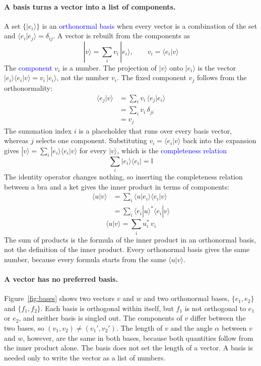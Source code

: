 \paragraph{A basis turns a vector into a list of components.} A set $\{|e_i\rangle\}$ is an \textcolor{blue}{orthonormal basis} when every vector is a combination of the set and $\langle e_i | e_j \rangle = \delta_{ij}$. A vector is rebuilt from the components as
\begin{equation*}
    |v\rangle = \sum_i v_i\, |e_i\rangle, \qquad v_i = \langle e_i | v \rangle
\end{equation*}
The \textcolor{blue}{component} $v_i$ is a number. The projection of $|v\rangle$ onto $|e_i\rangle$ is the vector $|e_i\rangle\langle e_i | v \rangle = v_i\, |e_i\rangle$, not the number $v_i$. The fixed component $v_j$ follows from the orthonormality:
\begin{align*}
    \langle e_j | v \rangle &= \sum_i v_i\, \langle e_j | e_i \rangle \\
    &= \sum_i v_i\, \delta_{ji} \\
    &= v_j
\end{align*}
The summation index $i$ is a placeholder that runs over every basis vector, whereas $j$ selects one component. Substituting $v_i = \langle e_i | v \rangle$ back into the expansion gives $|v\rangle = \sum_i |e_i\rangle\langle e_i | v \rangle$ for every $|v\rangle$, which is the \textcolor{blue}{completeness relation}
\begin{equation*}
    \sum_i |e_i\rangle\langle e_i| = \mathbb{I}
\end{equation*}
The identity operator changes nothing, so inserting the completeness relation between a bra and a ket gives the inner product in terms of components:
\begin{align*}
    \langle u | v \rangle &= \sum_i \langle u | e_i \rangle \langle e_i | v \rangle \\
    &= \sum_i \langle e_i | u \rangle^{*} \langle e_i | v \rangle
\end{align*}
\begin{equation}
    \boxed{\langle u | v \rangle = \sum_i u_i^{*}\, v_i}
\end{equation}
The sum of products is the formula of the inner product in an orthonormal basis, not the definition of the inner product. Every orthonormal basis gives the same number, because every formula starts from the same $\langle u | v \rangle$.

\paragraph{A vector has no preferred basis.} Figure~\ref{fig:bases} shows two vectors $v$ and $w$ and two orthonormal bases, $\{e_1, e_2\}$ and $\{f_1, f_2\}$. Each basis is orthogonal within itself, but $f_1$ is not orthogonal to $e_1$ or $e_2$, and neither basis is singled out. The components of $v$ differ between the two bases, so $(v_1, v_2) \neq (v_1', v_2')$. The length of $v$ and the angle $\alpha$ between $v$ and $w$, however, are the same in both bases, because both quantities follow from the inner product alone. The basis does not set the length of a vector. A basis is needed only to write the vector as a list of numbers.


